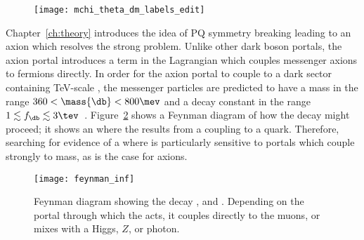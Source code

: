 \begin{figure}
  \begin{center}
    \texttt{[image: mchi\_theta\_dm\_labels\_edit]}
    \caption[Parameter space for a model including an inflaton]
    {
    }
    \label{fig:db:inflaton}
  \end{center}
\end{figure}


Chapter~\ref{ch:theory} introduces the idea of \gls{PQ} symmetry breaking leading to an axion
which resolves the strong \CP problem.
Unlike other dark boson portals, the axion portal introduces a term in the Lagrangian which couples
messenger axions to fermions directly.
In order for the axion portal to couple to a dark sector containing TeV-scale \dm, the messenger
particles are predicted to have a mass in the range $360<\mass{\db}<800\mev$ and a decay
constant in the range $1\lesssim f_\db\lesssim3\tev$~\cite{Nomura:2008ru}.
Figure~\ref{fig:db:feynman} shows a Feynman diagram of how the decay \btokstrdb might proceed;
it shows an \fcnc where the \db results from a coupling to a \tquark quark.
Therefore, searching for evidence of a \btokstrdb where \dbtomumu is particularly sensitive to
portals which couple strongly to mass, as is the case for axions.

\begin{figure}
  \begin{center}
    \texttt{[image: feynman\_inf]}
    \caption[Feynman diagram for the decay \btokstrdb]
    {
      Feynman diagram showing the decay \btokstrdb, and \dbtomumu.
      Depending on the portal through which the \db acts, it couples directly to the muons, or
      mixes with a \sm Higgs, $Z$, or photon.
    }
    \label{fig:db:feynman}
  \end{center}
\end{figure}


